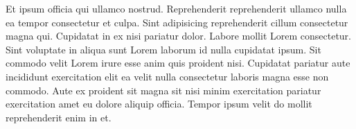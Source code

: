 \documentclass[
]{book}
\begin{document}
Et ipsum officia qui ullamco nostrud. Reprehenderit reprehenderit ullamco nulla ea tempor consectetur et culpa. Sint adipisicing reprehenderit cillum consectetur magna qui. Cupidatat in ex nisi pariatur dolor. Labore mollit Lorem consectetur. Sint voluptate in aliqua sunt Lorem laborum id nulla cupidatat ipsum. Sit commodo velit Lorem irure esse anim quis proident nisi. Cupidatat pariatur aute incididunt exercitation elit ea velit nulla consectetur laboris magna esse non commodo. Aute ex proident sit magna sit nisi minim exercitation pariatur exercitation amet eu dolore aliquip officia. Tempor ipsum velit do mollit reprehenderit enim in et.
\end{document}
